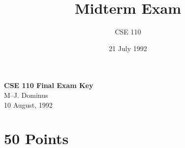 

\def\brac#1{$<$#1$>$}
\def\Int{{\tt int}}
\def\int{\brac{\Int}}
\def\int{\brac{\Int}}
\def\Shortint{{\tt short~int}}
\def\shortint{\brac{\Shortint}}
\def\Longint{{\tt long~int}}
\def\longint{\brac{\Longint}}
\def\Float{{\tt float}}
\def\float{\brac{\Float}}
\def\Double{{\tt double}}
\def\double{\brac{\Double}}
\def\Char{{\tt char}}
\def\chr{\brac{\Char}}
\def\Void{{\tt void}}
\def\void{\brac{\Void}}

\def\ptr#1{pointer~to #1}
\def\p2#1{\brac{\ptr#1}}
\def\Ano#1#2{array~of {#1}~#2s}
\def\ano#1#2{\brac{\Ano#1#2}}
\def\Ao#1{array~of #1}
\def\ao#1{\brac{\Ao#1}}

\def\breakhere{\mbox{$\otimes$}}
\parskip 8pt


\topmargin -0.5in
\textheight 9in


\title{Midterm Exam}
\author{CSE 110}
\date{21 July 1992}


\begin{center}
{\Large \bf CSE 110 Final Exam {\bf Key}}\\
\vspace{.2in}
{\large M--J. Dominus}\\
\vspace{.2in}
10 August, 1992
\end{center}

\section{50 Points}

